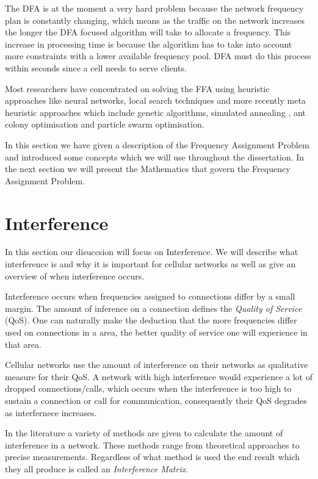 The DFA is at the moment a very hard problem because the network frequency plan is constantly changing, which means as the traffic on the network increases the longer the DFA focused algorithm will take to allocate a frequency. This increase in processing time is because the algorithm has to take into account more constraints with a lower available frequency pool. DFA must do this process within seconds since a cell needs to serve clients. 

Most researchers have concentrated on solving the FFA using heuristic approaches like neural networks, local search techniques and more recently meta heuristic approaches which include genetic algorithms, simulated annealing , ant colony optimisation and particle swarm optimisation.

In this section we have given a description of the Frequency Assignment Problem and introduced some concepts which we will use throughout the dissertation. In the next section we will present the 
Mathematics that govern the Frequency Assignment Problem.
\section{Interference}
\label{sec:Interference}
In this section our disuccsion will focus on Interference. We will describe what interference is and why it is important for cellular networks as well as give an overview of when interference occurs.

Interference occurs when frequencies assigned to connections differ by a small margin. The amount of inference on a connection defines the \emph{Quality of Service} (QoS). One can naturally make the deduction that the more frequencies differ used on connections in a area, the better quality of service one will experience in that area. 

Cellular networks use the amount of interference on their networks as qualitative measure for their QoS. A network with high interference would experience a lot of dropped connections/calls, which occurs when the interference is too high to sustain a connection or call for communication, consequently their QoS degrades as interfernece increases.

In the literature a variety of methods are given to calculate the amount of interference in a network. These methods range from theoretical approaches to precise measurements. Regardless of what method is used the end result which they all produce is called an \emph{Interference Matrix}\cite{ACOvsEA}.

